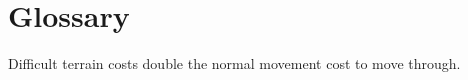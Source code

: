 \chapter{Glossary}\label{Glossary}

 Difficult terrain costs double the normal movement cost to move through.
